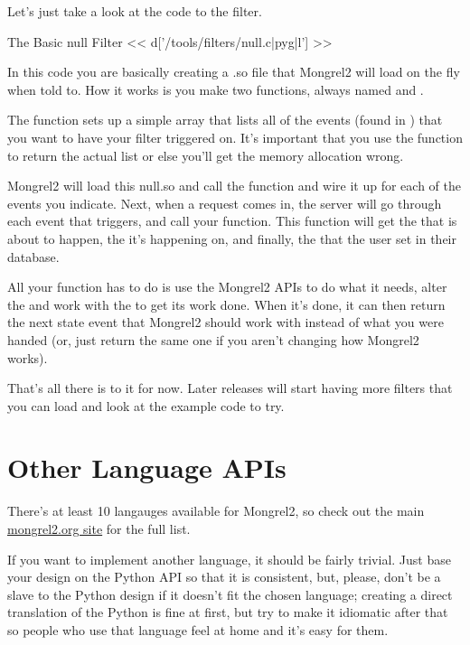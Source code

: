 Let's just take a look at the code to the 
filter.


\begin{code}{The Basic null Filter}
<< d['/tools/filters/null.c|pyg|l'] >>
\end{code}

In this code you are basically creating a .so file that Mongrel2 
will load on the fly when told to.  How it works is you make
two functions, always named  and .

The  function sets up a simple array that lists all
of the events (found in ) that you want to have your
filter triggered on.  It's important that you use the 
function to return the actual list or else you'll get the memory allocation
wrong.

Mongrel2 will load this null.so and call the  function
and wire it up for each of the events you indicate.  Next, when a request
comes in, the server will go through each event that triggers, and
call your  function.  This function will
get the  that is about to happen, the 
it's happening on, and finally, the  that the user
set in their  database.

All your  function has to do is use the
Mongrel2 APIs to do what it needs, alter the  and
work with the  to get its work done.  When it's done,
it can then return the next state event that Mongrel2 should work
with instead of what you were handed (or, just return the same one
if you aren't changing how Mongrel2 works).

That's all there is to it for now.  Later releases will start having
more filters that you can load and look at the example code to try.

\section{Other Language APIs}

There's at least 10 langauges available for Mongrel2, so check out the
main \href{http://mongrel2.org}{mongrel2.org site} for the full list.

If you want to implement another language, it should be fairly trivial.
Just base your design on the Python API so that it is consistent, but, please,
don't be a slave to the Python design if it doesn't fit the chosen language;
creating a direct translation of the Python is fine at first, but try
to make it idiomatic after that so people who use that language feel at
home and it's easy for them.


